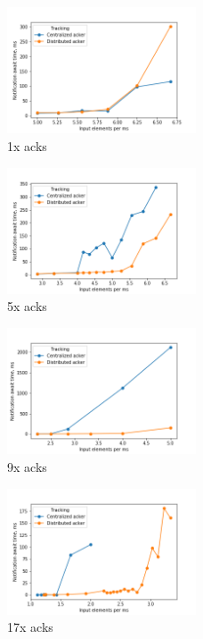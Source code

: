 \begin{figure}[htbp]
  \centering
  \includegraphics[width=0.50\textwidth]{pics/scalability_01x.png}
  \caption{1x acks}
\end{figure}
\begin{figure}[htbp]
  \centering
  \includegraphics[width=0.50\textwidth]{pics/scalability_05x.png}
  \caption{5x acks}
\end{figure}
\begin{figure}[htbp]
  \centering
  \includegraphics[width=0.50\textwidth]{pics/scalability_09x.png}
  \caption{9x acks}
\end{figure}
\begin{figure}[htbp]
  \centering
  \includegraphics[width=0.50\textwidth]{pics/scalability_17x.png}
  \caption{17x acks}
\end{figure}

